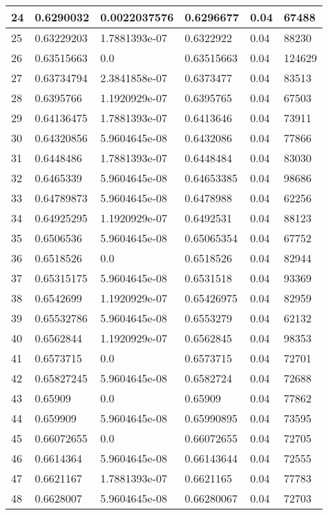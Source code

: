 \begin{longtable}{|l|l|l|l|l|l|}
24 & 0.6290032 & 0.0022037576 & 0.6296677 & 0.04 & 67488 \\ \hline 
25 & 0.63229203 & 1.7881393e-07 & 0.6322922 & 0.04 & 88230 \\ \hline 
26 & 0.63515663 & 0.0 & 0.63515663 & 0.04 & 124629 \\ \hline 
27 & 0.63734794 & 2.3841858e-07 & 0.6373477 & 0.04 & 83513 \\ \hline 
28 & 0.6395766 & 1.1920929e-07 & 0.6395765 & 0.04 & 67503 \\ \hline 
29 & 0.64136475 & 1.7881393e-07 & 0.6413646 & 0.04 & 73911 \\ \hline 
30 & 0.64320856 & 5.9604645e-08 & 0.6432086 & 0.04 & 77866 \\ \hline 
31 & 0.6448486 & 1.7881393e-07 & 0.6448484 & 0.04 & 83030 \\ \hline 
32 & 0.6465339 & 5.9604645e-08 & 0.64653385 & 0.04 & 98686 \\ \hline 
33 & 0.64789873 & 5.9604645e-08 & 0.6478988 & 0.04 & 62256 \\ \hline 
34 & 0.64925295 & 1.1920929e-07 & 0.6492531 & 0.04 & 88123 \\ \hline 
35 & 0.6506536 & 5.9604645e-08 & 0.65065354 & 0.04 & 67752 \\ \hline 
36 & 0.6518526 & 0.0 & 0.6518526 & 0.04 & 82944 \\ \hline 
37 & 0.65315175 & 5.9604645e-08 & 0.6531518 & 0.04 & 93369 \\ \hline 
38 & 0.6542699 & 1.1920929e-07 & 0.65426975 & 0.04 & 82959 \\ \hline 
39 & 0.65532786 & 5.9604645e-08 & 0.6553279 & 0.04 & 62132 \\ \hline 
40 & 0.6562844 & 1.1920929e-07 & 0.6562845 & 0.04 & 98353 \\ \hline 
41 & 0.6573715 & 0.0 & 0.6573715 & 0.04 & 72701 \\ \hline 
42 & 0.65827245 & 5.9604645e-08 & 0.6582724 & 0.04 & 72688 \\ \hline 
43 & 0.65909 & 0.0 & 0.65909 & 0.04 & 77862 \\ \hline 
44 & 0.659909 & 5.9604645e-08 & 0.65990895 & 0.04 & 73595 \\ \hline 
45 & 0.66072655 & 0.0 & 0.66072655 & 0.04 & 72705 \\ \hline 
46 & 0.6614364 & 5.9604645e-08 & 0.66143644 & 0.04 & 72555 \\ \hline 
47 & 0.6621167 & 1.7881393e-07 & 0.6621165 & 0.04 & 77783 \\ \hline 
48 & 0.6628007 & 5.9604645e-08 & 0.66280067 & 0.04 & 72703 \\ \hline 

\end{longtable}
